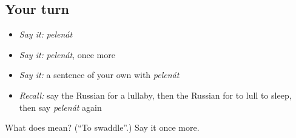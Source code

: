 \subsection*{Your turn}
\begin{itemize}
\raggedright
  \item \emph{Say it:} \emph{pelenát}
  \item \emph{Say it:} \emph{pelenát}, once more
  \item \emph{Say it:} a sentence of your own with \emph{pelenát}
  \item \emph{Recall:} say the Russian for a lullaby, then the Russian for to lull to sleep, then say \emph{pelenát} again
\end{itemize}

\begin{tcolorbox}[breakable,colback=teal!4,colframe=teal!35!black,title={Before you move on}]
What does  mean? (\textquotedblleft{}To swaddle\textquotedblright{}.) Say it once more.
\end{tcolorbox}
